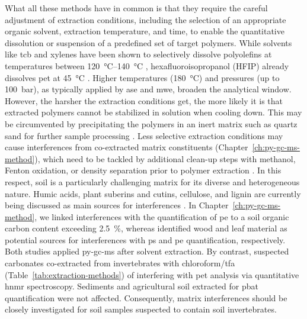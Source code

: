 What all these methods have in common is that they require the careful adjustment of extraction conditions, including the selection of an appropriate organic solvent, extraction temperature, and time, to enable the quantitative dissolution or suspension of a predefined set of target polymers. While solvents like \ac{tcb} and xylenes have been shown to selectively dissolve polyolefins at temperatures between \SIrange[range-phrase = { and }]{120}{140}{\degreeCelsius} \citep[Chapter~\ref{ch:py-gc-ms-method};][]{CeccariniHidden2018}, hexafluoroisopropanol (HFIP) already dissolves \ac{pet} at \SI{45}{\degreeCelsius} \citep{ElertComparison2017}. Higher temperatures (\SI{180}{\degreeCelsius}) and pressures (up to \SI{100}{\bar}), as typically applied by \ac{ase} and \ac{mwe}, broaden the analytical window. However, the harsher the extraction conditions get, the more likely it is that extracted polymers cannot be stabilized in solution when cooling down. This may be circumvented by precipitating the polymers in an inert matrix such as quartz sand for further sample processing \citep{DierkesQuantification2019}. Less selective extraction conditions may cause interferences from co-extracted matrix constituents (Chapter~\ref{ch:py-gc-ms-method}), which need to be tackled by additional clean-up steps with methanol, Fenton oxidation, or density separation prior to polymer extraction \citep{DierkesQuantification2019,PeezQuantitative2019}. In this respect, soil is a particularly challenging matrix for its diverse and heterogeneous nature.
Humic acids, plant suberins and cutins, cellulose, and lignin are currently being discussed as main sources for interferences \citep[Chapter~\ref{ch:py-gc-ms-method};][]{DierkesQuantification2019,OkoffoIdentification2020}.
In Chapter~\ref{ch:py-gc-ms-method}, we linked interferences with the quantification of \ac{pe} to a soil organic carbon content exceeding \SI{2.5}{\percent}, whereas \citet{DierkesQuantification2019} identified wood and leaf material as potential sources for interferences with \ac{ps} and \ac{pe} quantification, respectively. Both studies applied \ac{py-gc-ms} after solvent extraction. By contrast, \citet{PeezQuantitative2019} suspected carbonates co-extracted from invertebrates with chloroform\slash\ac{tfa}
(Table~\ref{tab:extraction-methods}) of interfering with \ac{pet} analysis via quantitative \ac{hnmr} spectroscopy.
Sediments \citep{PeezQuantitative2019} and agricultural soil extracted for \ac{pbat} quantification \citep{NelsonQuantification2019} were not affected. Consequently, matrix interferences should be closely investigated for soil samples suspected to contain soil invertebrates.

